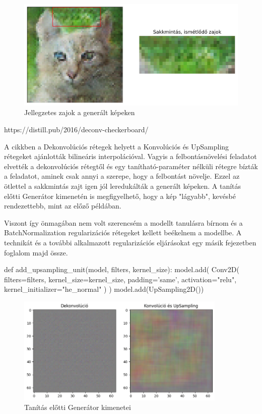 
\begin{figure}[h]
\centering
\includegraphics[width=13cm]{images/chessboard-patterns.png}
\caption{Jellegzetes zajok a generált képeken}
\label{fig:chessboard-patterns}
\end{figure}

https://distill.pub/2016/deconv-checkerboard/

A cikkben a Dekonvolúciós rétegek helyett a Konvolúciós és UpSampling rétegeket ajánlották bilineáris interpolációval. Vagyis a felbontásnövelési feladatot elvették a dekonvolúciós rétegtől és egy tanítható-paraméter nélküli rétegre bízták a feladatot, aminek csak annyi a szerepe, hogy a felbontást növelje. Ezzel az ötlettel a sakkmintás zajt igen jól leredukálták a generált képeken. A tanítás előtti Generátor kimenetén is megfigyelhető, hogy a kép "lágyabb", kevésbé rendezettebb, mint az előző példában.

Viszont így önmagában nem volt szerencsém a modellt tanulásra bírnom és a BatchNormalization regularizációs rétegeket kellett beékelnem a modellbe. A technikát és a további alkalmazott regularizációs eljárásokat egy másik fejezetben foglalom majd össze.

\begin{python}
def add_upsampling_unit(model,
                        filters, kernel_size):
    model.add(
        Conv2D(
            filters=filters,
            kernel_size=kernel_size,
            padding='same',
            activation="relu",
            kernel_initializer="he_normal"
        )
    )
    model.add(UpSampling2D())
\end{python}

\begin{figure}[h]
\centering
\includegraphics[width=10cm]{images/deconv-vs-conv_upsmpl.png}
\caption{Tanítás előtti Generátor kimenetei}
\label{fig:deconv-vs-conv_upsmpl}
\end{figure}


